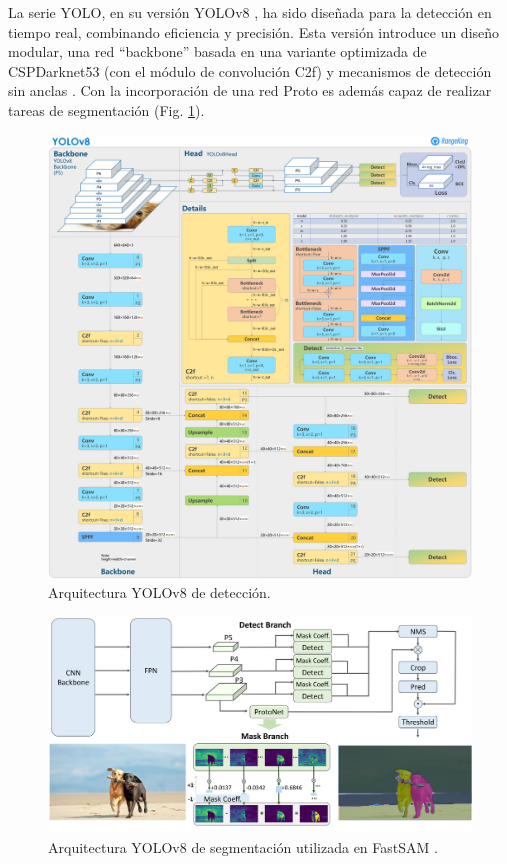 La serie YOLO, en su versión YOLOv8 \cite{yolov8_ultralytics}, ha sido diseñada para la detección en tiempo real, combinando eficiencia y precisión. Esta versión introduce un diseño modular, una red ``backbone'' basada en una variante optimizada de CSPDarknet53 (con el módulo de convolución C2f) y mecanismos de detección sin anclas \cite{YOLOv8}. Con la incorporación de una red Proto es además capaz de realizar tareas de segmentación (Fig. \ref{yolov8-seg}).

\begin{figure}[htbp]
    \centering
    \includegraphics[width=0.83\linewidth]{figures/Model YOLOv8.jpg}
    \caption[Arquitectura YOLOv8 de detección]{Arquitectura YOLOv8 de detección.}
\end{figure}

\begin{figure}[htbp]
    \centering
    \includegraphics[width=0.7\linewidth]{figures/Model YOLOv8seg.png}
    \caption[Arquitectura YOLOv8 de segmentación utilizada en FastSAM]{Arquitectura YOLOv8 de segmentación utilizada en FastSAM \cite{FastSAM}.}
    \label{yolov8-seg}
\end{figure}


